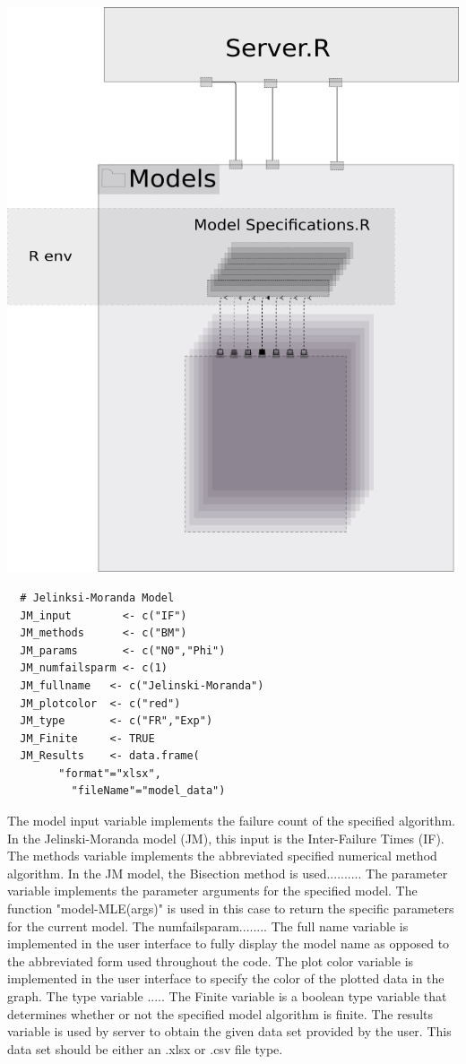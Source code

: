 \documentclass[journal]{IEEEtran}
\begin{document}
\includegraphics[scale=0.35]{ModelSpecifications.png}
\begin{verbatim}
  # Jelinksi-Moranda Model
  JM_input        <- c("IF")
  JM_methods      <- c("BM")
  JM_params       <- c("N0","Phi")
  JM_numfailsparm <- c(1)
  JM_fullname   <- c("Jelinski-Moranda")
  JM_plotcolor  <- c("red")
  JM_type       <- c("FR","Exp")
  JM_Finite     <- TRUE
  JM_Results    <- data.frame(
  		"format"="xlsx",
		  "fileName"="model_data")
\end{verbatim}

The model input variable implements the failure count of the specified algorithm. In the Jelinski-Moranda model (JM), this input is the Inter-Failure Times (IF). The methods variable implements the abbreviated specified numerical method algorithm. In the JM model, the Bisection method is used.......... The parameter variable implements the parameter arguments for the specified model. The function "model-MLE(args)" is used in this case to return the specific parameters for the current model. The numfailsparam........ The full name variable is implemented in the user interface to fully display the model name as opposed to the abbreviated form used throughout the code. The plot color variable is implemented in the user interface to specify the color of the plotted data in the graph. The type variable ..... The Finite variable is a boolean type variable that determines whether or not the specified model algorithm is finite. The results variable is used by server to obtain the given data set provided by the user.  This data set should be either an .xlsx or .csv file type.
 
\end{document}
